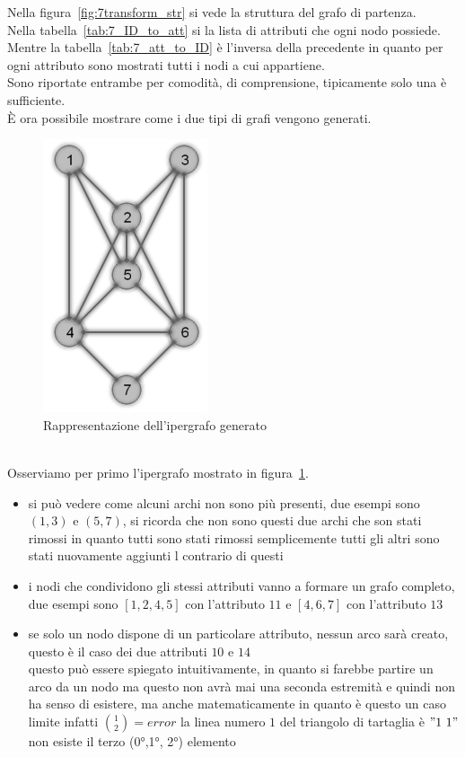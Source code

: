 %
%
\noindent Nella figura~\ref{fig:7transform_str} si vede la struttura del grafo di partenza.\\
Nella tabella~\ref{tab:7_ID_to_att} si la lista di attributi che ogni nodo possiede.\\
Mentre la tabella~\ref{tab:7_att_to_ID} è l'inversa della precedente in quanto per ogni attributo sono mostrati tutti i nodi a cui appartiene.\\
Sono riportate entrambe per comodità, di comprensione, tipicamente solo una è sufficiente.\\
È ora possibile mostrare come i due tipi di grafi vengono generati.
%
\begin{figure}[htp]
	\centering
	\includegraphics{immagini/7transform_hyper}
	\caption{Rappresentazione dell'ipergrafo generato}
	\label{fig:7transform_hyper}
\end{figure}
\\
Osserviamo per primo l'ipergrafo mostrato in figura~\ref{fig:7transform_hyper}.
\begin{itemize}
	\item  si può vedere come alcuni archi non sono più presenti, due esempi sono $(1,3)$ e $(5,7)$, si ricorda che non sono questi due archi che son stati rimossi in quanto tutti sono stati rimossi semplicemente tutti gli altri sono stati nuovamente aggiunti l contrario di questi
	\item  i nodi che condividono gli stessi attributi vanno a formare un grafo completo, due esempi sono $[1,2,4,5]$ con l'attributo $11$ e $[4,6,7]$ con l'attributo $13$
	\item  se solo un nodo dispone di un particolare attributo, nessun arco sarà creato, questo è il caso dei due attributi $10$ e $14$\\
	questo può essere spiegato intuitivamente, in quanto si farebbe partire un arco da un nodo ma questo non avrà mai una seconda estremità e quindi non ha senso di esistere, ma anche matematicamente in quanto è questo un caso limite infatti $ \displaystyle\binom{1}{2} = error$ la linea numero $1$ del triangolo di tartaglia è $"1\ 1"$ non esiste il terzo (0°,1°, 2°) elemento
\end{itemize}
